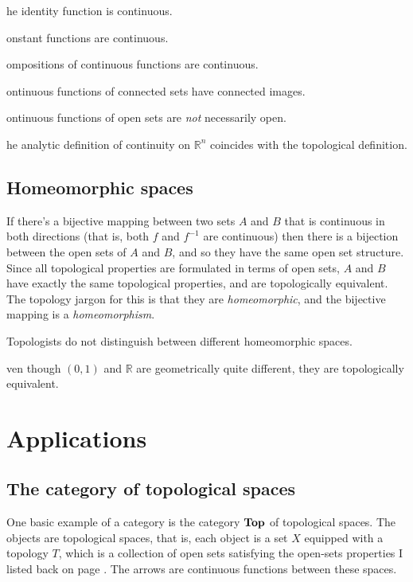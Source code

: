 \documentclass{article}
\def\R{{\mathbb R}}
\def\Rn{{\R^n}}
\def\cat#1{{\bf #1}}
\newcounter{exercisecounter}\setcounter{exercisecounter}{1}
\def\Exercise.#1\par{{\item\small \makebox{\bf Exercise \number\theexercisecounter.\hspace{0.5em}}\unskip\ignorespaces#1\addtocounter{exercisecounter}{1}}}
\begin{document}
\begin{itemize}
\Exercise. The identity function is continuous.

\Exercise. Constant functions are continuous.

\Exercise. Compositions of continuous functions are continuous.

\Exercise. Continuous functions of connected sets have connected images.

\Exercise. Continuous functions of open sets are {\em not\/} necessarily open.

\Exercise. The analytic definition of continuity on $\Rn$ coincides with the
topological definition.

\end{itemize}

\subsection*{Homeomorphic spaces}

If there's a bijective mapping between two sets $A$ and $B$ that is
continuous in both directions (that is, both $f$ and $f^{-1}$ are
continuous) then there is a bijection between the open sets of $A$ and
$B$, and so they have the same open set structure.  Since all
topological properties are formulated in terms of open sets, $A$ and
$B$ have exactly the same topological properties, and are
topologically equivalent.  The topology jargon for this is that they
are {\em homeomorphic\/}, and the bijective mapping is a {\em 
homeomorphism\/}. 

Topologists do not distinguish between different homeomorphic
spaces.

\begin{itemize}
\Exercise.  Even though $(0,1)$ and $\R$ are geometrically quite
different, they are topologically equivalent.

\end{itemize}

\section*{Applications}

\subsection*{The category of topological spaces}

One basic example of a category is the category $\cat{Top}$ of
topological spaces.  The objects are topological spaces, that is, each
object is a set $X$ equipped with a topology $T$, which is a
collection of open sets satisfying the open-sets properties I listed
back on page \pageref{topology-def}.  The arrows are continuous
functions between these spaces.
\end{document}
